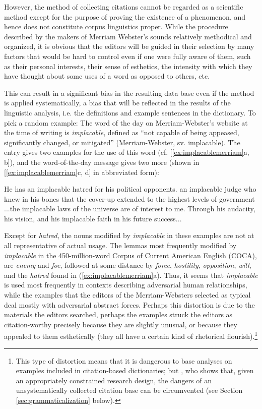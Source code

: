 However, the method of collecting citations cannot be regarded as a scientific method except for the purpose of proving the existence of a phenomenon, and hence does not constitute corpus linguistics proper. While the procedure described by the makers of Merriam Webster's sounds relatively methodical and organized, it is obvious that the editors will be guided in their selection by many factors that would be hard to control even if one were fully aware of them, such as their personal interests, their sense of esthetics, the intensity with which they have thought about some uses of a word as opposed to others, etc.

This can result in a significant bias in the resulting data base even if the method is applied systematically, a bias that will be reflected in the results of the linguistic analysis, i.e. the definitions and example sentences in the dictionary. To pick a random example: The word of the day on Merriam-Webster's website at the time of writing is \textit{implacable}, defined as ``not capable of being appeased, significantly changed, or mitigated'' (Merriam-Webster, sv. implacable). The entry gives two examples for the use of this word (cf. [\ref{ex:implacablemerriam}a, b]), and the word-of-the-day message gives two more (shown in [\ref{ex:implacablemerriam}c, d] in abbreviated form):

\begin{exe}
\ex
\begin{xlist} 
\label{ex:implacablemerriam}
\ex He has an implacable hatred for his political opponents.
\ex an implacable judge who knew in his bones that the cover-up extended to the highest levels of government
\ex ...the implacable laws of the universe are of interest to me.
\ex Through his audacity, his vision, and his implacable faith in his future success...
\end{xlist}
\end{exe}

Except for \textit{hatred}, the nouns modified by \textit{implacable} in these examples are not at all representative of actual usage. The lemmas most frequently modified by \textit{implacable} in the 450-million-word Corpus of Current American English (COCA), are \textit{enemy} and \textit{foe}, followed at some distance by \textit{force}, \textit{hostility}, \textit{opposition}, \textit{will}, and the \textit{hatred} found in (\ref{ex:implacablemerriam}a). Thus, it seems that \textit{implacable} is used most frequently in contexts describing adversarial human relationships, while the examples that the editors of the Merriam-Websters selected as typical deal mostly with adversarial abstract forces. Perhaps this distortion is due to the materials the editors searched, perhaps the examples struck the editors as citation-worthy precisely because they are slightly unusual, or because they appealed to them esthetically (they all have a certain kind of rhetorical flourish).\footnote{This type of distortion means that it is dangerous to base analyses on examples included in citation-based dictionaries; but \cite[cf.][]{lindquist_corpus_2004}, who shows that, given an appropriately constrained research design, the dangers of an unsystematically collected citation base can be circumvented (see Section \ref{sec:grammaticalization} below).}

